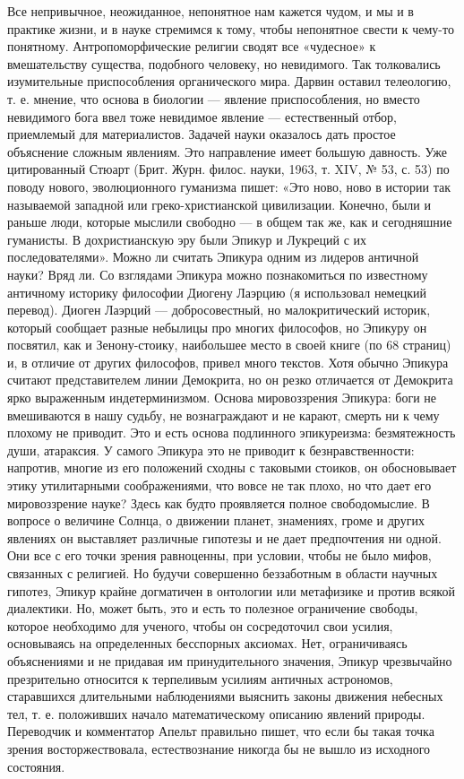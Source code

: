 Все непривычное, неожиданное,  непонятное нам кажется чудом, и  мы и в
практике жизни, и в науке стремимся  к тому, чтобы непонятное свести к
чему-то  понятному. Антропоморфические  религии сводят  все «чудесное»
к  вмешательству  существа,  подобного человеку,  но  невидимого.  Так
толковались  изумительные  приспособления органического  мира.  Дарвин
оставил телеологию,  т. е. мнение,  что основа в биологии  --- явление
приспособления, но вместо невидимого  бога ввел тоже невидимое явление
--- естественный  отбор, приемлемый  для материалистов.  Задачей науки
оказалось дать  простое объяснение  сложным явлениям.  Это направление
имеет большую  давность. Уже  цитированный Стюарт (Брит.  Журн. филос.
науки, 1963,  т. XIV,  № 53,  с. 53)  по поводу  нового, эволюционного
гуманизма пишет: «Это ново, ново в истории так называемой западной или
греко-христианской цивилизации.  Конечно, были и раньше  люди, которые
мыслили свободно  --- в общем так  же, как и сегодняшние  гуманисты. В
дохристианскую  эру  были Эпикур  и  Лукреций  с их  последователями».
Можно ли  считать Эпикура  одним из лидеров  античной науки?  Вряд ли.
Со  взглядами  Эпикура  можно познакомиться  по  известному  античному
историку философии  Диогену Лаэрцию (я использовал  немецкий перевод).
Диоген Лаэрций --- добросовестный, но малокритический историк, который
сообщает разные небылицы про многих философов, но Эпикуру он посвятил,
как и Зенону-стоику, наибольшее место в своей книге (по 68 страниц) и,
в  отличие от  других  философов, привел  много  текстов. Хотя  обычно
Эпикура считают представителем линии Демокрита, но он резко отличается
от  Демокрита ярко  выраженным  индетерминизмом. Основа  мировоззрения
Эпикура:  боги  не  вмешиваются  в нашу  судьбу,  не  вознаграждают  и
не  карают,  смерть  ни  к  чему  плохому  не  приводит.  Это  и  есть
основа подлинного эпикуреизма: безмятежность души, атараксия. У самого
Эпикура  это  не приводит  к  безнравственности:  напротив, многие  из
его  положений  сходны  с  таковыми  стоиков,  он  обосновывает  этику
утилитарными соображениями,  что вовсе не  так плохо, но что  дает его
мировоззрение науке? Здесь как будто проявляется полное свободомыслие.
В  вопросе о  величине  Солнца, о  движении  планет, знамениях,  громе
и  других  явлениях  он  выставляет   различные  гипотезы  и  не  дает
предпочтения  ни одной.  Они все  с его  точки зрения  равноценны, при
условии,  чтобы  не  было  мифов,  связанных  с  религией.  Но  будучи
совершенно  беззаботным  в  области  научных  гипотез,  Эпикур  крайне
догматичен в онтологии или метафизике  и против всякой диалектики. Но,
может  быть,  это и  есть  то  полезное ограничение  свободы,  которое
необходимо для ученого, чтобы он сосредоточил свои усилия, основываясь
на определенных  бесспорных аксиомах. Нет,  ограничиваясь объяснениями
и  не   придавая  им  принудительного  значения,   Эпикур  чрезвычайно
презрительно  относится  к  терпеливым  усилиям  античных  астрономов,
старавшихся длительными наблюдениями выяснить законы движения небесных
тел, т. е. положивших начало математическому описанию явлений природы.
Переводчик и  комментатор Апельт  правильно пишет,  что если  бы такая
точка зрения  восторжествовала, естествознание никогда бы  не вышло из
исходного состояния.


